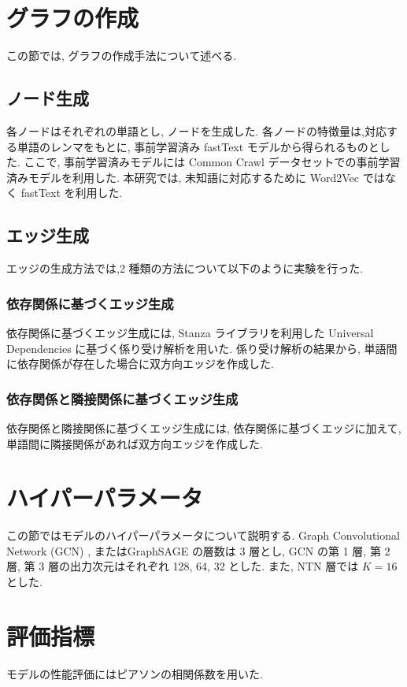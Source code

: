 \documentclass[a4j,twoside,12pt]{thesis} %
\begin{document}
\section{グラフの作成}
この節では, グラフの作成手法について述べる.

\subsection{ノード生成}
各ノードはそれぞれの単語とし, ノードを生成した.
各ノードの特徴量は,対応する単語のレンマをもとに, 事前学習済み fastText\cite{bojanowski2017enriching} モデルから得られるものとした.
ここで, 事前学習済みモデルには Common Crawl データセットでの事前学習済みモデルを利用した.
本研究では, 未知語に対応するために Word2Vec ではなく fastText を利用した.

\subsection{エッジ生成}
エッジの生成方法では,2 種類の方法について以下のように実験を行った.
\subsubsection{依存関係に基づくエッジ生成}
依存関係に基づくエッジ生成には, Stanza\cite{qi2020stanza} ライブラリを利用した Universal Dependencies に基づく係り受け解析を用いた.
係り受け解析の結果から, 単語間に依存関係が存在した場合に双方向エッジを作成した.

\subsubsection{依存関係と隣接関係に基づくエッジ生成}
依存関係と隣接関係に基づくエッジ生成には, 依存関係に基づくエッジに加えて, 単語間に隣接関係があれば双方向エッジを作成した.

\section{ハイパーパラメータ}
この節ではモデルのハイパーパラメータについて説明する.
Graph Convolutional Network (GCN) \cite{kipf2017semi} , またはGraphSAGE \cite{hamilton2017inductive} の層数は 3 層とし, GCN の第 1 層, 第 2 層, 第 3 層の出力次元はそれぞれ 128, 64, 32 とした. また, NTN 層では $K=16$ とした.

\section{評価指標}
モデルの性能評価にはピアソンの相関係数を用いた.
\end{document}
